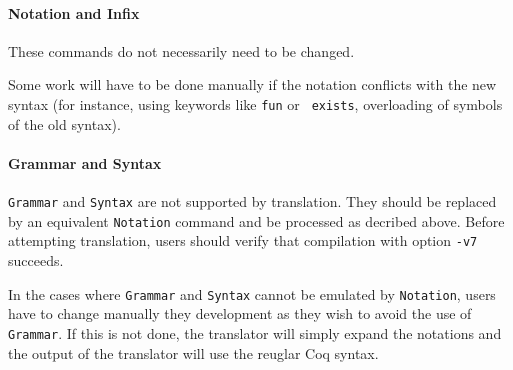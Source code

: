 \documentclass[11pt,a4paper]{article}
\begin{document}
\paragraph{Notation and Infix}

These commands do not necessarily need to be changed.

Some work will have to be done manually if the notation conflicts with
the new syntax (for instance, using keywords like {\tt fun} or {\tt
exists}, overloading of symbols of the old syntax).


\paragraph{Grammar and Syntax}

{\tt Grammar} and {\tt Syntax} are not supported by translation. They
should be replaced by an equivalent {\tt Notation} command and be
processed as decribed above. Before attempting translation, users
should verify that compilation with option {\tt -v7} succeeds.

In the cases where {\tt Grammar} and {\tt Syntax} cannot be emulated
by {\tt Notation}, users have to change manually they development as
they wish to avoid the use of {\tt Grammar}. If this is not done, the
translator will simply expand the notations and the output of the
translator will use the reuglar Coq syntax.
\end{document}
